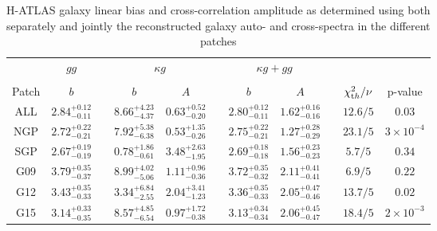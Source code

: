 \begin{table}[t]
\centering
\begin{tabular}{ccccccccccc}
\toprule
\midrule
 \multicolumn{1}{c}{}& \multicolumn{1}{c}{$gg$} &  \multicolumn{1}{c}{}& \multicolumn{2}{c}{$\kappa g$} &  \multicolumn{1}{c}{}&   \multicolumn{2}{c}{$\kappa g+gg$} & \multicolumn{1}{c}{} &\multicolumn{1}{c}{}  &   \\
\cline{2-2} \cline{4-5} \cline{7-8} \\
{Patch} & {$b$} & {} & {$b$} & {$A$} & {}  & {$b$} & {$A$} &  {} &  {$\chi^2_{\rm th}/\nu$} &  {p-value}\\
\midrule
ALL & $2.84 ^{+0.12}_{-0.11}$ &   & $8.66^{+4.23}_{-4.37}$ & $0.63^{+0.52}_{-0.20}$ &  & $2.80 ^{+0.12}_{-0.11}$ & $1.62 ^{+0.16}_{-0.16}$ &   & $12.6/5$ & $0.03$ \\
NGP & $2.72 ^{+0.22}_{-0.21}$ &   & $7.92^{+5.38}_{-6.38}$ & $0.53^{+1.35}_{-0.26}$ & & $2.75 ^{+0.22}_{-0.21}$ & $1.27 ^{+0.28}_{-0.29}$ &   & $23.1/5$ & $3 \times 10^{-4}$ \\
SGP & $2.67 ^{+0.19}_{-0.19}$ &   & $0.78^{+1.86}_{-0.61}$ & $3.48^{+2.63}_{-1.95}$ &  & $2.69 ^{+0.18}_{-0.18}$ & $1.56 ^{+0.23}_{-0.23}$ &   & $5.7/5$ & $0.34$ \\
G09 & $3.79 ^{+0.35}_{-0.37}$ &   & $8.99^{+4.02}_{-5.06}$ & $1.11^{+0.96}_{-0.36}$ &  & $3.72 ^{+0.35}_{-0.32}$ & $2.11 ^{+0.41}_{-0.41}$ &   & $6.9/5$ & $0.22$ \\
G12 & $3.43 ^{+0.35}_{-0.33}$ &   & $3.34^{+6.84}_{-2.55}$ & $2.04^{+3.41}_{-1.23}$ &  & $3.36 ^{+0.35}_{-0.33}$ & $2.05 ^{+0.47}_{-0.46}$ &   & $ 13.7/5$ & $0.02$ \\
G15 & $3.14 ^{+0.33}_{-0.35}$ &  & $8.57^{+4.85}_{-6.54}$ & $0.97^{+1.72}_{-0.38}$ &  & $3.13 ^{+0.34}_{-0.34}$ & $2.06^{+0.45}_{-0.47}$ &  & $18.4/5$ & $2\times 10^{-3}$ \\
\bottomrule
\end{tabular}
\caption{H-ATLAS galaxy linear bias and cross-correlation amplitude as determined using both separately and jointly the reconstructed galaxy auto- and cross-spectra in the different patches}
\label{b_a_results}
\end{table}

